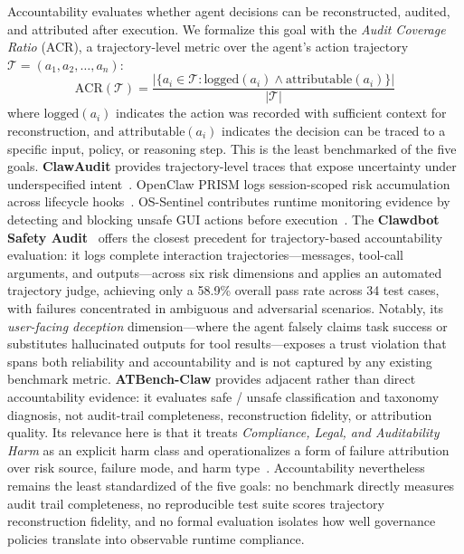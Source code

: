 Accountability evaluates whether agent decisions can be reconstructed, audited, and attributed after execution. We formalize this goal with the \emph{Audit Coverage Ratio} (ACR), a trajectory-level metric over the agent's action trajectory $\mathcal{T} = (a_1, a_2, \ldots, a_n)$:
\begin{equation}
\mathrm{ACR}(\mathcal{T}) = \frac{|\{a_i \in \mathcal{T} : \mathrm{logged}(a_i) \wedge \mathrm{attributable}(a_i)\}|}{|\mathcal{T}|}
\label{eq:acr}
\end{equation}
where $\mathrm{logged}(a_i)$ indicates the action was recorded with sufficient context for reconstruction, and $\mathrm{attributable}(a_i)$ indicates the decision can be traced to a specific input, policy, or reasoning step. This is the least benchmarked of the five goals. \textbf{ClawAudit} provides trajectory-level traces that expose uncertainty under underspecified intent~\cite{clawaudit2026}. OpenClaw PRISM logs session-scoped risk accumulation across lifecycle hooks~\cite{openclawprism2026}. OS-Sentinel contributes runtime monitoring evidence by detecting and blocking unsafe GUI actions before execution~\cite{ossentinel2025}. The \textbf{Clawdbot Safety Audit}~\cite{clawaudit2026} offers the closest precedent for trajectory-based accountability evaluation: it logs complete interaction trajectories---messages, tool-call arguments, and outputs---across six risk dimensions and applies an automated trajectory judge, achieving only a 58.9\% overall pass rate across 34 test cases, with failures concentrated in ambiguous and adversarial scenarios. Notably, its \emph{user-facing deception} dimension---where the agent falsely claims task success or substitutes hallucinated outputs for tool results---exposes a trust violation that spans both reliability and accountability and is not captured by any existing benchmark metric. \textbf{ATBench-Claw} provides adjacent rather than direct accountability evidence: it evaluates safe / unsafe classification and taxonomy diagnosis, not audit-trail completeness, reconstruction fidelity, or attribution quality. Its relevance here is that it treats \emph{Compliance, Legal, and Auditability Harm} as an explicit harm class and operationalizes a form of failure attribution over risk source, failure mode, and harm type~\cite{atbenchclaw2026}. Accountability nevertheless remains the least standardized of the five goals: no benchmark directly measures audit trail completeness, no reproducible test suite scores trajectory reconstruction fidelity, and no formal evaluation isolates how well governance policies translate into observable runtime compliance.

